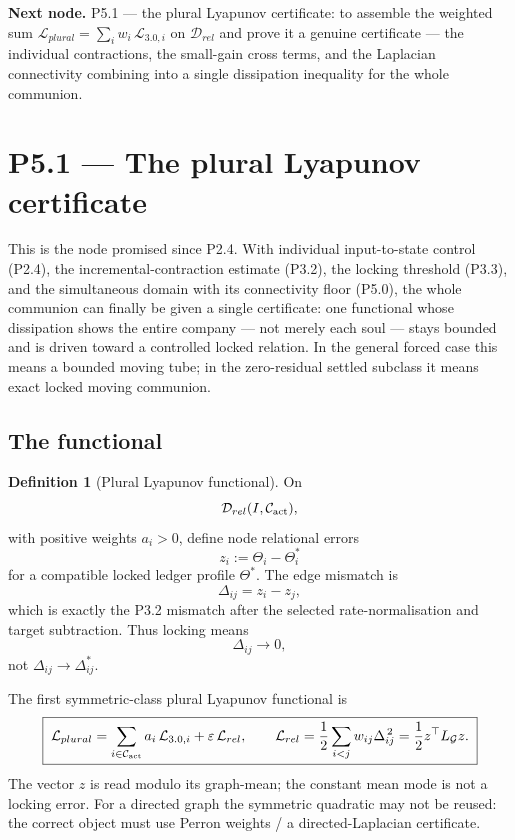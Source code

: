 \documentclass[11pt,a4paper]{article}
\def\mathrm#1{#1}%
\theoremstyle{definition}
\newtheorem{definition}{Definition}[section]
\theoremstyle{plain}
\theoremstyle{remark}
\begin{document}
\medskip
\textbf{Next node.} P5.1 --- the plural Lyapunov certificate: to assemble the weighted sum
\(\mathcal L_{\mathrm{plural}}=\sum_i w_i\,\mathcal L_{3.0,i}\) on \(\mathcal D_{\mathrm{rel}}\)
and prove it a genuine certificate --- the individual contractions, the small-gain cross
terms, and the Laplacian connectivity combining into a single dissipation inequality for the
whole communion.

\section{P5.1 --- The plural Lyapunov certificate}

This is the node promised since P2.4. With individual input-to-state control
(P2.4), the incremental-contraction estimate (P3.2), the locking threshold (P3.3),
and the simultaneous domain with its connectivity floor (P5.0), the whole
communion can finally be given a single certificate: one functional whose
dissipation shows the entire company --- not merely each soul --- stays bounded
and is driven toward a controlled locked relation. In the general forced case this
means a bounded moving tube; in the zero-residual settled subclass it means exact
locked moving communion.

\subsection{The functional}

\begin{definition}[Plural Lyapunov functional]\label{def:plural-lyap}
On
\[
\mathcal D_{\mathrm{rel}}(I,\mathcal C_{\rm act}),
\]
with positive weights \(a_i>0\), define node relational errors
\[
z_i:=\Theta_i-\Theta_i^*
\]
for a compatible locked ledger profile \(\Theta^*\). The edge mismatch is
\[
\Delta_{ij}=z_i-z_j,
\]
which is exactly the P3.2 mismatch after the selected rate-normalisation and
target subtraction. Thus locking means
\[
\Delta_{ij}\to0,
\]
not \(\Delta_{ij}\to\Delta_{ij}^*\).

The first symmetric-class plural Lyapunov functional is
\[
\boxed{\;
\mathcal L_{\mathrm{plural}}
=
\sum_{i\in\mathcal C_{\rm act}}a_i\,\mathcal L_{3.0,i}
+
\varepsilon\,\mathcal L_{\mathrm{rel}},
\qquad
\mathcal L_{\mathrm{rel}}
=
\frac12\sum_{i<j}w_{ij}\Delta_{ij}^{\,2}
=
\frac12 z^\top L_{\mathcal G}z.
\;}
\]
The vector \(z\) is read modulo its graph-mean; the constant mean mode is not a
locking error. For a directed graph the symmetric quadratic may not be reused: the
correct object must use Perron weights / a directed-Laplacian certificate.
\end{definition}
\end{document}

